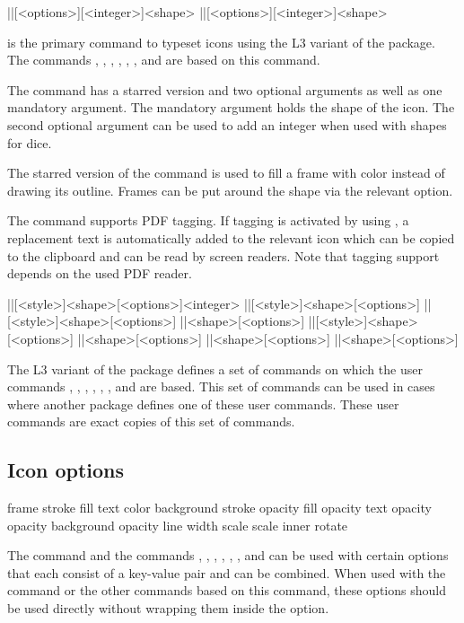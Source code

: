 \documentclass[a4paper]{article}
\begin{document}
\begin{macrodef}
|\RPGIconsUseIcon|[<options>][<integer>]{<shape>}
|\RPGIconsUseIcon*|[<options>][<integer>]{<shape>}
\end{macrodef}
\macro{\RPGIconsUseIcon} is the primary command to typeset icons using the L3 variant of the package. The commands \macro{\die}, \macro{\ability}, \macro{\saving}, \macro{\spell}, \macro{\spellschool}, \macro{\damage}, \macro{\attack} and \macro{\condition} are based on this command.

The \macro{\RPGIconsUseIcon} command has a starred version and two optional arguments as well as one mandatory argument. The mandatory argument holds the shape of the icon. The second optional argument can be used to add an integer when used with shapes for dice.

The starred version of the command is used to fill a frame with color instead of drawing its outline. Frames can be put around the shape via the relevant  option.

The \macro{\RPGIconsUseIcon} command supports PDF tagging. If tagging is activated by using , a replacement text is automatically added to the relevant icon which can be copied to the clipboard and can be read by screen readers. Note that tagging support depends on the used PDF reader.

\begin{macrodef}
|\RPGIconsDie|[<style>]{<shape>}[<options>]{<integer>}
|\RPGIconsAbiliy|[<style>]{<shape>}[<options>]
|\RPGIconsSaving|[<style>]{<shape>}[<options>]
|\RPGIconsSpell|{<shape>}[<options>]
|\RPGIconsSpellschool|[<style>]{<shape>}[<options>]
|\RPGIconsDamage|{<shape>}[<options>]
|\RPGIconsAttack|{<shape>}[<options>]
|\RPGIconsCondition|{<shape>}[<options>]
\end{macrodef}
The L3 variant of the package defines a set of commands on which the user commands \macro{\die}, \macro{\ability}, \macro{\saving}, \macro{\spell}, \macro{\spellschool}, \macro{\damage}, \macro{\attack} and \macro{\condition} are based. This set of commands can be used in cases where another package defines one of these user commands. These user commands are exact copies of this set of commands.

\subsection{Icon options}

\begin{macrodef}
frame
stroke
fill
text
color
background
stroke opacity
fill opacity
text opacity
opacity
background opacity
line width
scale
scale inner
rotate
\end{macrodef}
The \macro{\RPGIconsUseIcon} command and the commands \macro{\die}, \macro{\ability}, \macro{\saving}, \macro{\spell}, \macro{\spellschool}, \macro{\damage}, \macro{\attack} and \macro{\condition} can be used with certain options that each consist of a key-value pair and can be combined. When used with the \macro{\RPGIconsUseIcon} command or the other commands based on this command, these options should be used directly without wrapping them inside the  option.
\end{document}
